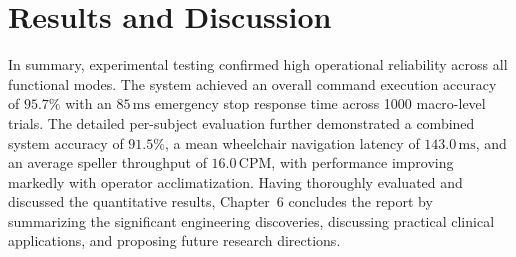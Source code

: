 \chapter{Results and Discussion}
\label{ch:results}










\vspace{1em}
In summary, experimental testing confirmed high operational reliability across all functional modes. The system achieved an overall command execution accuracy of $95.7\%$ with an $85\,\text{ms}$ emergency stop response time across 1000 macro-level trials. The detailed per-subject evaluation further demonstrated a combined system accuracy of $91.5\%$, a mean wheelchair navigation latency of $143.0\,\text{ms}$, and an average speller throughput of $16.0\,\text{CPM}$, with performance improving markedly with operator acclimatization. Having thoroughly evaluated and discussed the quantitative results, Chapter~6 concludes the report by summarizing the significant engineering discoveries, discussing practical clinical applications, and proposing future research directions.
